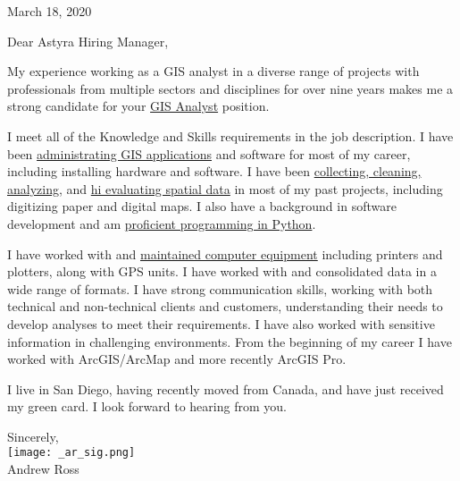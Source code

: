 \documentclass[letterpaper]{article}
\newcommand{\impt}[1]{\underline{#1}}
\begin{document}
\large

\null\hfill March 18, 2020
\vspace{1em}

Dear Astyra Hiring Manager,

My experience working as a GIS analyst in a diverse range of projects with
professionals from multiple sectors and disciplines for over nine years makes me
a strong candidate for your \impt{GIS Analyst} position.


I meet all of the Knowledge and Skills requirements in the job description.  I
have been \impt{administrating GIS applications} and software for most of my
career, including installing hardware and software.  I have been
\impt{collecting, cleaning, analyzing}, and \underline{hi evaluating spatial data} in
most of my past projects, including digitizing paper and digital maps.  I also
have a background in software development and am \impt{proficient programming in
Python}.

I have worked with and \impt{maintained computer equipment} including printers and
plotters, along with GPS units.  I have worked with and consolidated data in a
wide range of formats.  I have strong communication skills, working with both
technical and non-technical clients and customers, understanding their needs to
develop analyses to meet their requirements.  I have also worked with sensitive
information in challenging environments.  From the beginning of my career I have
worked with ArcGIS/ArcMap and more recently ArcGIS Pro.


I live in San Diego, having recently moved from Canada, and have just received
my green card. I look forward to hearing from you.  


Sincerely,\\
\hspace{1em} \texttt{[image: \_ar\_sig.png]} \\
Andrew Ross
\end{document}
